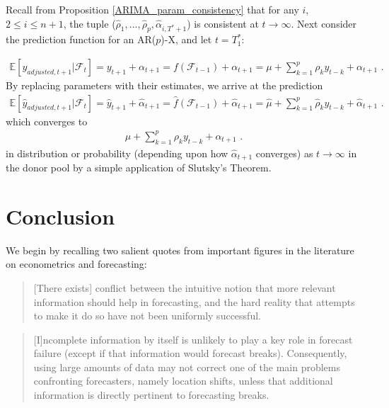 \documentclass{uiucthesis2021}
\def\E{\mathbb{E}} %
\theoremstyle{definition}
\newenvironment{proof-of-proposition}[1][{}]{\noindent{\bf
    Proof of Proposition {#1}}
  \hspace*{.5em}}{\qed\bigskip\\}
\begin{document}
    \begin{proof-of-proposition}[\ref{ARIMA_conv_distribution}]
  
      Recall from Proposition \ref{ARIMA_param_consistency} that for any $i$, $2\leq i \leq n+1$, the tuple 
      ($\hat\rho_{1},...,\hat\rho_{p}, \hat\alpha_{i,T^{*}+1}$) is consistent at $t\rightarrow \infty$.  Next consider the prediction function for an AR($p$)-X, and let $t = T_{1}^{*}$:
  
      \begin{align*}
      \E[y_{adjusted,t+1}|\mathcal{F}_{t}] = y_{t+1} + \alpha_{t+1} = f(\mathcal{F}_{t-1}) + \alpha_{t+1} = \mu + \sum^{p}_{k=1}\rho_{k}y_{t-k} + \alpha_{t+1} \text{ .}
      \end{align*}
      By replacing parameters with their estimates, we arrive at the prediction 
      \begin{align*}
        \E[\hat{y}_{adjusted,t+1}|\mathcal{F}_{t}] = \hat{y}_{t+1} + \hat\alpha_{t+1} = \hat{f}(\mathcal{F}_{t-1}) + \hat\alpha_{t+1} = \hat\mu + \sum^{p}_{k=1}\hat\rho_{k}y_{t-k} + \hat{\alpha}_{t+1} \text{ .}
        \end{align*}
      which converges to 
      \begin{align*}
         \mu + \sum^{p}_{k=1}\rho_{k}y_{t-k} + \alpha_{t+1} \text{ .}
        \end{align*}
      in distribution or probability (depending upon how $\hat\alpha_{t+1}$ converges) as $t\rightarrow\infty$ in the donor pool by a simple application of Slutsky's Theorem.
      
      \end{proof-of-proposition}
      

\chapter{Conclusion}

We begin by recalling two salient quotes from important figures in the literature on econometrics and forecasting:

\begin{quote}
  [There exists] conflict between the intuitive notion that more relevant information should help in forecasting, and the hard reality that attempts to make it do so have not been uniformly successful.\parencite[][]{clements2005guest}
\end{quote}

\begin{quote}
[I]ncomplete information by itself is unlikely to play a key role in forecast failure (except if that information would forecast breaks). Consequently, using large amounts of data may not correct one of the main problems confronting forecasters, namely location shifts, unless that additional information is directly pertinent to forecasting breaks. \parencite[][]{castle2013forecasting}
\end{quote}
\end{document}
